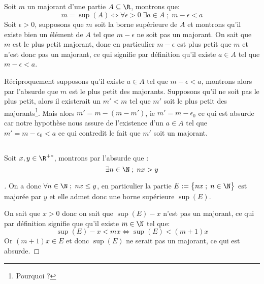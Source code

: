 \documentclass{report}
\begin{document}
   \subsection*{}
   Soit \(m\) un majorant d'une partie \(A \subseteq \R\), montrons que:
   \[
      m = \sup(A) \Longleftrightarrow \forall \epsilon > 0 \; \exists a \in A \; ; \; m - \epsilon < a  
   \]
   Soit \(\epsilon > 0\), supposons que \(m\) soit la borne supérieure de \(A\) et montrons qu'il existe bien un élément de \(A\) tel que \(m - \epsilon\) ne soit pas un majorant.
   On sait que \(m\) est le plus petit majorant, donc en particulier \(m - \epsilon\) est plus petit que \(m\) et n'est donc pas un majorant, ce qui signifie par définition qu'il existe \(a \in A\) tel que \(m - \epsilon < a\).\<

   Réciproquement supposons qu'il existe \(a \in A\) tel que \(m - \epsilon < a\), montrons alors par l'absurde que \(m\) est le plus petit des majorants. Supposons qu'il ne soit pas le plus petit, alors il existerait un \(m' < m\) tel que \(m'\) soit le plus petit des majorants\footnote{\label{Pourquoi1} Pourquoi ?}.\+
   Mais alors \(m' = m - (m - m')\), ie \(m' = m - \epsilon_0\) ce qui est absurde car notre hypothèse nous assure de l'existence d'un \(a \in A\) tel que \(m' = m - \epsilon_0 < a\) ce qui contredit le fait que \(m'\) soit un majorant.

   \subsection*{}
   Soit \(x, y \in \R^{+*}\), montrons par l'absurde que :
   \[
      \exists n \in \N  \; ; \; nx > y  
   \]
   \begin{proof}[\unskip\nopunct]
   On a donc \(\forall n \in \N \; ; \; nx \leq y\), en particulier la partie \(E := \bigl\{ nx \; ; \; n \in \N \bigl\}\) est majorée par \(y\) et elle admet donc une borne supérieure \(\sup(E)\).\<

   On sait que \(x > 0\) donc on sait que \(\sup(E) - x\) n'est pas un majorant, ce qui par définition signifie que qu'il existe \(m \in \N\) tel que:
   \[
      \sup(E) - x < mx \Longleftrightarrow \sup(E) < (m + 1)x  
   \] 
   Or \((m+1)x \in E\) et donc \(\sup(E)\) ne serait pas un majorant, ce qui est absurde.
   \end{proof}
\end{document}
